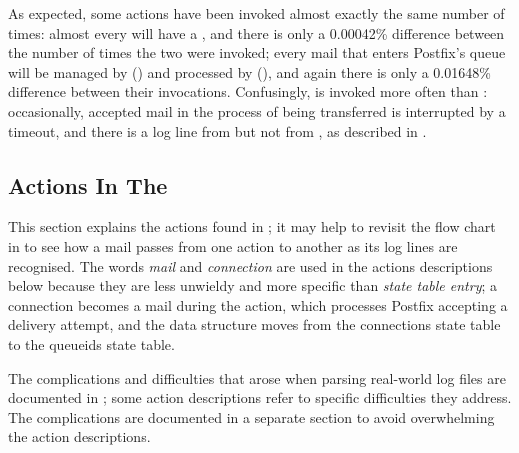 As expected, some actions have been invoked almost exactly the same number
of times: almost every  will have a ,
and there is only a 0.00042\% difference between the number of times the
two were invoked; every mail that enters Postfix's queue will be managed by
 () and processed by 
(), and again there is only a 0.01648\%
difference between their invocations.  Confusingly,
 is invoked more often than
: occasionally, accepted mail in the process of being
transferred is interrupted by a timeout, and there is a log line from
 but not from , as described in
.



\subsection{Actions In The \parsernamelong{}}

\label{actions in detail in implementation}

This section explains the actions found in \parsername{}; it may help to
revisit the flow chart in  to see how a mail passes
from one action to another as its log lines are recognised.  The words
\textit{mail\/} and \textit{connection\/} are used in the actions
descriptions below because they are less unwieldy and more specific than
\textit{state table entry\/}; a connection becomes a mail during the
 action, which processes Postfix accepting a delivery
attempt, and the data structure moves from the connections state table to
the queueids state table.

The complications and difficulties that arose when parsing real-world log
files are documented in ; some action
descriptions refer to specific difficulties they address.  The
complications are documented in a separate section to avoid overwhelming
the action descriptions.

